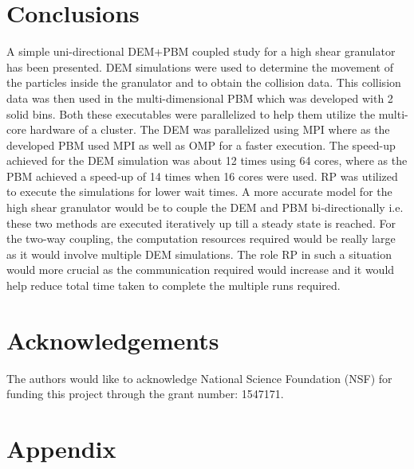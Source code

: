 \documentclass[preprint,11pt,authoryear]{elsarticle}
\begin{document}
\section{Conclusions}
 A simple uni-directional DEM+PBM coupled study for a high shear granulator has been presented. DEM simulations were 
used to determine the movement of the particles inside the granulator and to obtain the collision data. This collision data 
was then used in the multi-dimensional PBM which was developed with 2 solid bins. Both these executables were parallelized 
to help them utilize the multi-core hardware of a cluster. The DEM was parallelized using MPI where as the developed PBM used 
MPI as well as OMP for a faster execution. The speed-up achieved for the DEM simulation was about 12 times using 64 cores, 
where as the PBM achieved a speed-up of 14 times when 16 cores were used. RP was utilized to execute the simulations for lower 
wait times.
 A more accurate model for the high shear granulator would be to couple the DEM and PBM bi-directionally i.e. these 
two methods are executed iteratively up till a steady state is reached. For the two-way coupling, the computation resources 
required would be really large as it would involve multiple DEM simulations. The role RP in such a situation would more crucial 
as the communication required would increase and it would help reduce total time taken to complete the multiple runs required. 

\section{Acknowledgements}
The authors would like to acknowledge National Science Foundation (NSF) for 
funding this project
through the grant number: 1547171.
\section*{Appendix}
\end{document}
